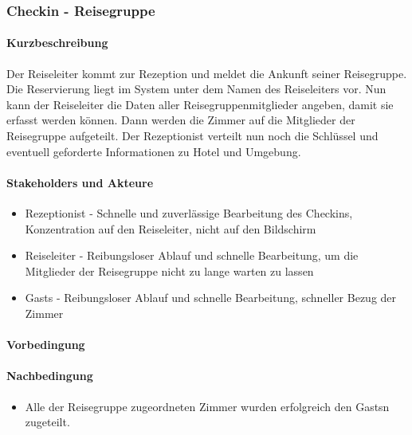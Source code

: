 \subsubsection{Checkin - Reisegruppe}

\paragraph{Kurzbeschreibung}
Der \Gls{Reiseleiter} kommt zur \Gls{Rezeption} und meldet die Ankunft seiner Reisegruppe. Die \Gls{Reservierung} liegt im System unter dem Namen des \Gls{Reiseleiter}s vor. Nun kann der \Gls{Reiseleiter} die Daten aller Reisegruppenmitglieder angeben, damit sie erfasst werden können.
Dann werden die Zimmer auf die Mitglieder der Reisegruppe aufgeteilt. Der Rezeptionist verteilt nun noch die Schlüssel und eventuell geforderte Informationen zu Hotel und Umgebung.

\paragraph{Stakeholders und Akteure}
\begin{itemize}
	\item \Gls{Rezeptionist} - Schnelle und zuverlässige Bearbeitung des \Gls{Checkin}s, Konzentration auf den  \Gls{Reiseleiter}, nicht auf den Bildschirm
	\item \Gls{Reiseleiter} - Reibungsloser Ablauf und schnelle Bearbeitung, um die Mitglieder der Reisegruppe nicht zu lange warten zu lassen
	\item \Glspl{Gast} - Reibungsloser Ablauf und schnelle Bearbeitung, schneller Bezug der \Gls{Zimmer}
\end{itemize}

\paragraph{Vorbedingung}

\paragraph{Nachbedingung}
\begin{itemize}
	\item Alle der Reisegruppe zugeordneten \Gls{Zimmer} wurden erfolgreich den \Glspl{Gast}n zugeteilt.
\end{itemize}

